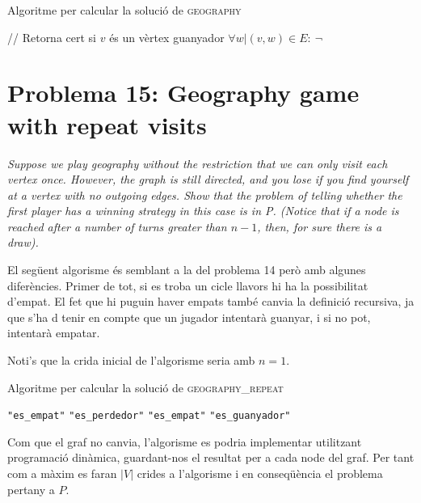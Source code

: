 \documentclass[a4paper]{article}
\begin{document}
\begin{algorithm}[H]
	\caption{Algoritme per calcular la solució de \textsc{geography}}
	\begin{algorithmic}[1]
		\State // Retorna cert si $v$ és un vèrtex guanyador
			\State \Return $\forall w | (v,w) \in E : \ \neg$ 
		\EndFunction
	\end{algorithmic}
\end{algorithm}

\pagebreak
\section{Problema 15: Geography game with repeat visits}
\emph{Suppose we play geography without the restriction that we can only visit each vertex once. However, the graph is still directed, and you lose if you find yourself at a vertex with no outgoing edges. Show that the problem of telling whether the first player has a winning strategy in this case is in P. (Notice that if a node is reached after a number of turns greater than $n − 1$, then, for sure there is a draw).}

El següent algorisme és semblant a la del problema 14 però amb algunes diferències. Primer de tot, si es troba un cicle llavors hi ha la possibilitat d'empat. El fet que hi puguin haver empats també canvia la definició recursiva, ja que s'ha d tenir en compte que un jugador intentarà guanyar, i si no pot, intentarà empatar.

Noti's que la crida inicial de l'algorisme seria amb $n=1$.

\begin{algorithm}[H]
	\caption{Algoritme per calcular la solució de \textsc{geography\_repeat}}
	\begin{algorithmic}[1]
				\State \Return \texttt{"es\_empat"}
				\State \Return \texttt{"es\_perdedor"}
				\State \Return \texttt{"es\_empat"}
			\Else
				\State \Return \texttt{"es\_guanyador"}
			\EndIf
		\EndFunction
	\end{algorithmic}
\end{algorithm}

Com que el graf no canvia, l'algorisme es podria implementar utilitzant programació dinàmica, guardant-nos el resultat per a cada node del graf. Per tant com a màxim es faran $|V|$ crides a l'algorisme i en conseqüència el problema pertany a $P$.
\end{document}
